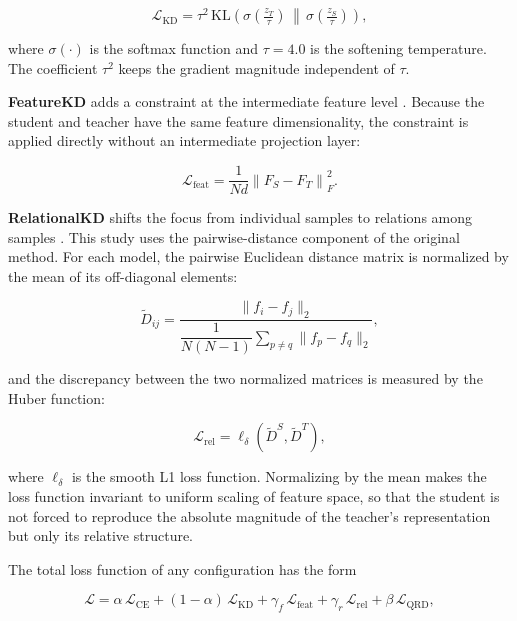 \begin{equation}
\label{eq:kd}
\mathcal{L}_{\mathrm{KD}} = \tau^{2}\,
  \mathrm{KL}\!\left(
  \sigma\!\left(\tfrac{z_T}{\tau}\right) \,\middle\|\,
  \sigma\!\left(\tfrac{z_S}{\tau}\right)\right),
\end{equation}

where $\sigma(\cdot)$ is the softmax function and $\tau = 4.0$ is the
softening temperature. The coefficient $\tau^{2}$ keeps the gradient
magnitude independent of $\tau$.

\textbf{FeatureKD} adds a constraint at the intermediate feature
level \cite{romero2015fitnets}. Because the student and teacher have
the same feature dimensionality, the constraint is applied directly
without an intermediate projection layer:

\begin{equation}
\label{eq:feat}
\mathcal{L}_{\mathrm{feat}} = \frac{1}{Nd}
  \left\| F_S - F_T \right\|_{F}^{2}.
\end{equation}

\textbf{RelationalKD} shifts the focus from individual samples to
relations among samples \cite{park2019relational}. This study uses
the pairwise-distance component of the original method. For each
model, the pairwise Euclidean distance matrix is normalized by the
mean of its off-diagonal elements:

\begin{equation}
\label{eq:pdist}
\tilde{D}_{ij} = \frac{\|f_i - f_j\|_2}
  {\dfrac{1}{N(N-1)}\displaystyle\sum_{p \neq q} \|f_p - f_q\|_2},
\end{equation}

and the discrepancy between the two normalized matrices is measured
by the Huber function:

\begin{equation}
\label{eq:rkd}
\mathcal{L}_{\mathrm{rel}} = \ell_{\delta}\!\left(
  \tilde{D}^{S}, \tilde{D}^{T} \right),
\end{equation}

where $\ell_{\delta}$ is the smooth L1 loss function. Normalizing by
the mean makes the loss function invariant to uniform scaling of
feature space, so that the student is not forced to reproduce the
absolute magnitude of the teacher's representation but only its
relative structure.

The total loss function of any configuration has the form

\begin{equation}
\label{eq:total}
\mathcal{L} = \alpha\,\mathcal{L}_{\mathrm{CE}}
  + (1-\alpha)\,\mathcal{L}_{\mathrm{KD}}
  + \gamma_{f}\,\mathcal{L}_{\mathrm{feat}}
  + \gamma_{r}\,\mathcal{L}_{\mathrm{rel}}
  + \beta\,\mathcal{L}_{\mathrm{QRD}},
\end{equation}


